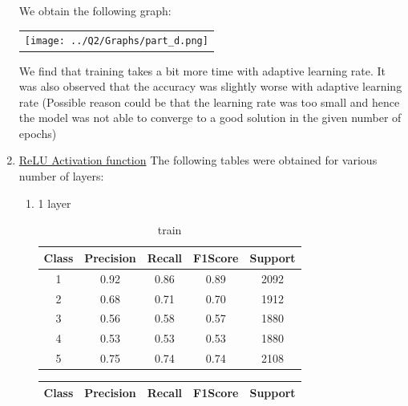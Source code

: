 \begin{enumerate}[label=(\alph*)]
\begin{enumerate}[label=\roman*.]
          \end{enumerate}
          We obtain the following graph:
          \begin{center}
              \begin{tabular}{c}
                  \texttt{[image: ../Q2/Graphs/part\_d.png]}
              \end{tabular}
          \end{center}
          We find that training takes a bit more time with adaptive learning rate. It was also observed that the accuracy was slightly worse with adaptive learning rate (Possible reason could be that the learning rate was too small and hence the model was not able to converge to a good solution in the given number of epochs)
    \item \underline{ReLU Activation function} The following tables were obtained for various number of layers:
          \begin{enumerate}[label=\roman*.]
              \item 1 layer
                    \begin{table}[!htb]
                        \centering
                        \begin{tabular}{ccccc}
                            \hline
                            Class & Precision & Recall & F1Score & Support \\ \hline
                            1     & 0.92      & 0.86   & 0.89    & 2092    \\
                            2     & 0.68      & 0.71   & 0.70    & 1912    \\
                            3     & 0.56      & 0.58   & 0.57    & 1880    \\
                            4     & 0.53      & 0.53   & 0.53    & 1880    \\
                            5     & 0.75      & 0.74   & 0.74    & 2108    \\ \hline
                        \end{tabular}
                        \caption{train}
                        \label{part e train depth 1}
                    \end{table}
                    \begin{table}[!htb]
                        \centering
                        \begin{tabular}{ccccc}
                            \hline
                            Class & Precision & Recall & F1Score & Support \\ \hline

\end{tabular}
\end{table}
\end{enumerate}
\end{enumerate}
